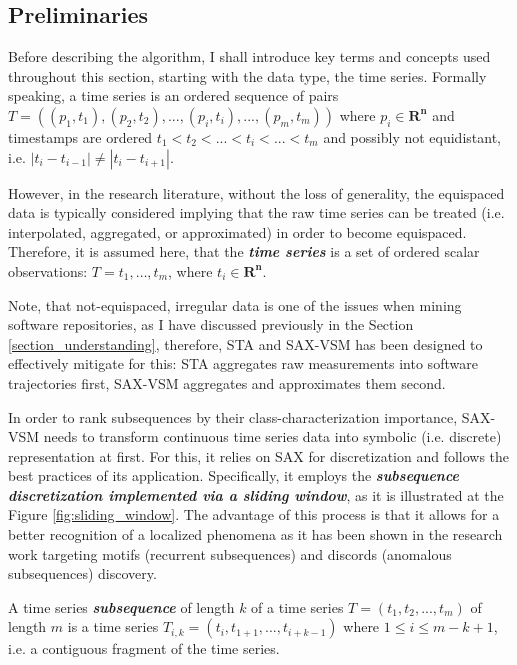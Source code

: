 \subsection{Preliminaries}
Before describing the algorithm, I shall introduce key terms and concepts used throughout this section, starting with the data type,
the time series.
Formally speaking, a time series is an ordered sequence of pairs 
\mbox{$T=((p_{1},t_{1}),(p_{2},t_{2}),...,(p_{i},t_{i}),...,(p_{m},t_{m}))$}
where $p_{i} \in \mathbf{R^{n}}$ and timestamps are ordered $t_{1} < t_{2} < ... < t_{i} <...<t_{m}$ 
and possibly not equidistant, i.e. $|t_{i}-t_{i-1}| \neq |t_{i}-t_{i+1}|$.

However, in the research literature, without the loss of generality, the equispaced data is typically considered implying that the 
raw time series can be treated (i.e. interpolated, aggregated, or approximated) in order to become equispaced. 
Therefore, it is assumed here, that the \textbf{\textit{time series}} is a set of ordered scalar observations: 
$T = t_{1},\dots,t_{m}$, where $t_{i} \in \mathbf{R^{n}}$.

Note, that not-equispaced, irregular data is one of the issues when mining software repositories, as I have discussed previously in 
the Section \ref{section_understanding}, therefore, STA and SAX-VSM has been designed to effectively mitigate for this: 
STA aggregates raw measurements into software trajectories first, SAX-VSM aggregates and approximates them second.

In order to rank subsequences by their class-characterization importance, SAX-VSM needs to transform continuous time series data 
into symbolic (i.e. discrete) representation at first. For this, it relies on SAX \cite{citeulike:2821475} for discretization and follows 
the best practices of its application. Specifically, it employs the \textit{\textbf{subsequence discretization implemented via a sliding window}}, 
as it is illustrated at the Figure \ref{fig:sliding_window}. The advantage of this process is that it allows for a better recognition of 
a localized phenomena as it has been shown in the research work targeting motifs (recurrent subsequences) \cite{citeulike:3977965} 
and discords (anomalous subsequences) \cite{citeulike:3175749} discovery.

A time series \textbf{\textit{subsequence}} of length $k$ of a time series $T = (t_{1}, t_{2},...,t_{m})$ of length $m$ is a time 
series $T_{i,k} = (t_{i},t_{1+1},...,t_{i+k-1})$  where $1 \leq i \leq m - k + 1$, i.e. a contiguous fragment of the time series.

